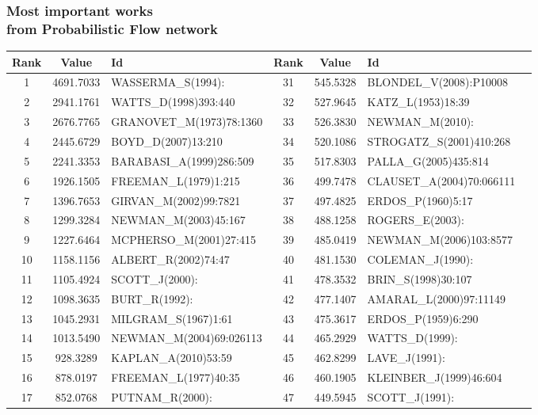 \documentclass[hyperref={pdfstartview={FitBH -32768},
                         pdfpagemode=FullScreen,
                         plainpages=false,
                         colorlinks=true}
              ]{beamer}
\begin{document}
\begin{frame}[fragile]
\frametitle{Most important works \\ \normalsize from Probabilistic  Flow network}
\small

\renewcommand{\arraystretch}{0.82}
\tiny
\begin{tabular}{c|c|l||c|c|l|l}
Rank&   	Value&   	Id&   	Rank&   	Value&   	Id\\ \hline
1&   	4691.7033&   	WASSERMA\_S(1994):&   	31&   	545.5328&   	BLONDEL\_V(2008):P10008\\
2&   	2941.1761&   	WATTS\_D(1998)393:440&   	32&   	527.9645&   	KATZ\_L(1953)18:39\\
3&   	2676.7765&   	GRANOVET\_M(1973)78:1360&   	33&   	526.3830&   	NEWMAN\_M(2010):\\
4&   	2445.6729&   	BOYD\_D(2007)13:210&   	34&   	520.1086&   	STROGATZ\_S(2001)410:268\\
5&   	2241.3353&   	BARABASI\_A(1999)286:509&   	35&   	517.8303&   	PALLA\_G(2005)435:814\\
6&   	1926.1505&   	FREEMAN\_L(1979)1:215&   	36&   	499.7478&   	CLAUSET\_A(2004)70:066111\\
7&   	1396.7653&   	GIRVAN\_M(2002)99:7821&   	37&   	497.4825&   	ERDOS\_P(1960)5:17\\
8&   	1299.3284&   	NEWMAN\_M(2003)45:167&   	38&   	488.1258&   	ROGERS\_E(2003):\\
9&   	1227.6464&   	MCPHERSO\_M(2001)27:415&   	39&   	485.0419&   	NEWMAN\_M(2006)103:8577\\
10&   	1158.1156&   	ALBERT\_R(2002)74:47&   	40&   	481.1530&   	COLEMAN\_J(1990):\\
11&   	1105.4924&   	SCOTT\_J(2000):&   	41&   	478.3532&   	BRIN\_S(1998)30:107\\
12&   	1098.3635&   	BURT\_R(1992):&   	42&   	477.1407&   	AMARAL\_L(2000)97:11149\\
13&   	1045.2931&   	MILGRAM\_S(1967)1:61&   	43&   	475.3617&   	ERDOS\_P(1959)6:290\\
14&   	1013.5490&   	NEWMAN\_M(2004)69:026113&   	44&   	465.2929&   	WATTS\_D(1999):\\
15&   	928.3289&   	KAPLAN\_A(2010)53:59&   	45&   	462.8299&   	LAVE\_J(1991):\\
16&   	878.0197&   	FREEMAN\_L(1977)40:35&   	46&   	460.1905&   	KLEINBER\_J(1999)46:604\\
17&   	852.0768&   	PUTNAM\_R(2000):&   	47&   	449.5945&   	SCOTT\_J(1991):\\

\end{tabular}
\end{frame}
\end{document}
